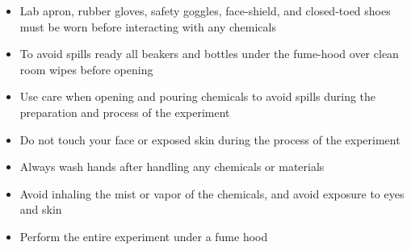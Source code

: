 \begin{center} %
    \begin{framed} %
        \begin{minipage}{0.8\textwidth} %
            \raggedright %

            \begin{itemize}
                \item Lab apron, rubber gloves, safety goggles, face-shield, and closed-toed shoes must be worn before interacting with any chemicals
                \item To avoid spills ready all beakers and bottles under the fume-hood over clean room wipes before opening
                \item Use care when opening and pouring chemicals to avoid spills during the preparation and process of the experiment
                \item Do not touch your face or exposed skin during the process of the experiment
                \item Always wash hands after handling any chemicals or materials
                \item Avoid inhaling the mist or vapor of the chemicals, and avoid exposure to eyes and skin
                \item Perform the entire experiment under a fume hood
            \end{itemize}
        \end{minipage}
    \end{framed}
\end{center}


